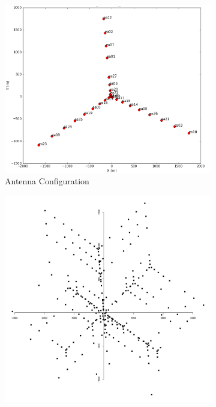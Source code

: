 \begin{figure}[h!]
	\centering
	\begin{subfigure}[b]{0.3\linewidth}
		 \includegraphics[width=\linewidth, trim={18px 19px 18px 18px}, clip]{./chapters/01.intro/img/antennas.png}
		 \caption{Antenna Configuration}
	\end{subfigure}
	\begin{subfigure}[b]{0.3\linewidth}
		\includegraphics[width=\linewidth, trim={18px 19px 18px 18px}, clip]{./chapters/01.intro/img/uv.png}

\end{subfigure}
\end{figure}
